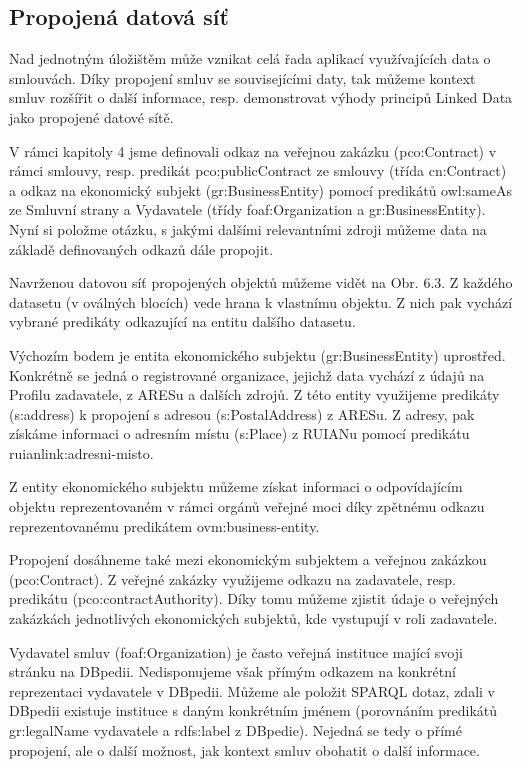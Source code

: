 \subsection{Propojená datová síť}

Nad jednotným úložištěm může vznikat celá řada aplikací využívajících data o smlouvách. Díky propojení smluv se souvisejícími daty, tak můžeme kontext smluv rozšířit o další informace, resp. demonstrovat výhody principů Linked Data jako propojené datové sítě.  

V rámci kapitoly 4 jsme definovali odkaz na veřejnou zakázku (pco:Contract) v rámci smlouvy, resp. predikát pco:publicContract ze smlouvy (třída cn:Contract) a odkaz na ekonomický subjekt (gr:BusinessEntity) pomocí predikátů owl:sameAs ze Smluvní strany a Vydavatele (třídy foaf:Organization a gr:BusinessEntity). Nyní si položme otázku, s jakými dalšími relevantními zdroji můžeme data na základě definovaných odkazů dále propojit.

Navrženou datovou síť propojených objektů můžeme vidět na Obr. 6.3. Z každého datasetu (v oválných blocích) vede hrana k vlastnímu objektu. Z nich pak vychází vybrané predikáty odkazující na entitu dalšího datasetu. 

Výchozím bodem je entita ekonomického subjektu (gr:BusinessEntity) uprostřed. Konkrétně se jedná o registrované organizace, jejichž data vychází z údajů na Profilu zadavatele, z ARESu a dalších zdrojů. Z této entity využijeme predikáty (s:address) k propojení s adresou (s:PostalAddress) z ARESu. Z adresy, pak získáme informaci o adresním místu (s:Place) z RUIANu pomocí predikátu ruianlink:adresni-misto.

Z entity ekonomického subjektu můžeme získat informaci o odpovídajícím objektu reprezentovaném v rámci orgánů veřejné moci díky zpětnému odkazu reprezentovanému predikátem ovm:business-entity. 

Propojení dosáhneme také mezi ekonomickým subjektem a veřejnou zakázkou (pco:Contract). Z veřejné zakázky využijeme odkazu na zadavatele, resp. predikátu (pco:contractAuthority). Díky tomu můžeme zjistit údaje o veřejných zakázkách jednotlivých ekonomických subjektů, kde vystupují v roli zadavatele.

Vydavatel smluv (foaf:Organization) je často veřejná instituce mající svoji stránku na DBpedii. Nedisponujeme však přímým odkazem na konkrétní reprezentaci vydavatele v DBpedii. Můžeme ale položit SPARQL dotaz, zdali v DBpedii existuje instituce s daným konkrétním jménem (porovnáním predikátů gr:legalName vydavatele a rdfs:label z DBpedie). Nejedná se tedy o přímé propojení, ale o další možnost, jak kontext smluv obohatit o další informace.

